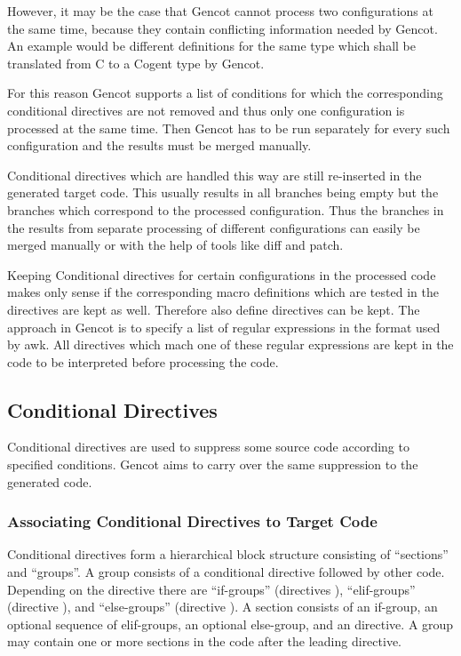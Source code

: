 However, it may be the case that Gencot cannot process two configurations at the same time, because they contain
conflicting information needed by Gencot. An example would be different definitions for the same type which
shall be translated from C to a Cogent type by Gencot.

For this reason Gencot supports a list of conditions for which the corresponding conditional directives are not 
removed and thus only one configuration is processed at the same time. Then Gencot has to be run separately for every
such configuration and the results must be merged manually.

Conditional directives which are handled this way are still re-inserted in the generated target code. This
usually results in all branches being empty but the branches which correspond to the processed configuration.
Thus the branches in the results from separate processing of different configurations can easily be merged manually
or with the help of tools like diff and patch.

Keeping Conditional directives for certain configurations in the processed code makes only sense if the corresponding
macro definitions which are tested in the directives are kept as well. Therefore also define directives can be
kept. The approach in Gencot is to specify a list of regular expressions in the format used by awk. All directives
which mach one of these regular expressions are kept in the code to be interpreted before processing the code.

\subsection{Conditional Directives}

Conditional directives are used to suppress some source code according to specified conditions. Gencot aims to
carry over the same suppression to the generated code.

\subsubsection{Associating Conditional Directives to Target Code}

Conditional directives form a hierarchical block structure consisting of ``sections'' and ``groups''. A group
consists of a conditional directive followed by other code. Depending on the directive there are ``if-groups''
(directives ), ``elif-groups'' (directive ), and ``else-groups''
(directive ). A section consists of an if-group, an optional sequence of elif-groups, an optional
else-group, and an  directive. A group may contain one or more sections in the code after the
leading directive.

